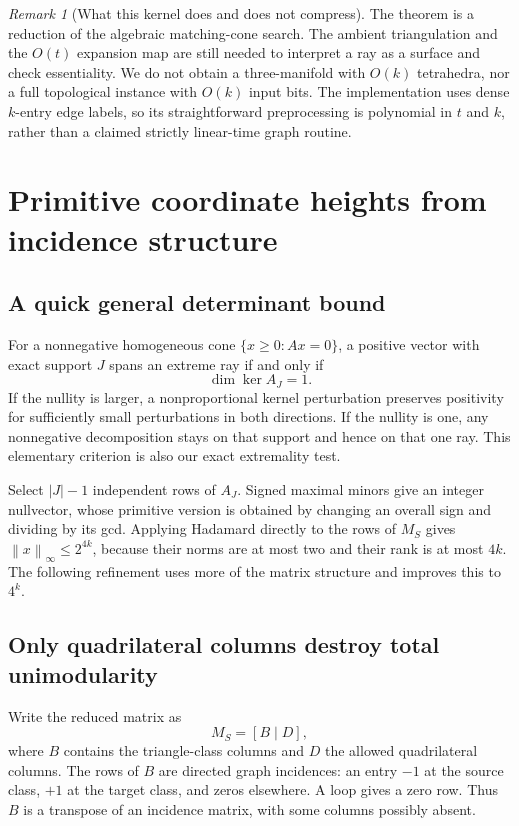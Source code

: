 \documentclass[11pt]{article}
\theoremstyle{definition}
\theoremstyle{remark}
\newtheorem{remark}[theorem]{Remark}
\newcommand{\norm}[1]{\left\lVert#1\right\rVert}
\begin{document}
\begin{remark}[What this kernel does and does not compress]
The theorem is a reduction of the algebraic matching-cone search. The ambient
triangulation and the $O(t)$ expansion map are still needed to interpret a ray
as a surface and check essentiality. We do not obtain a three-manifold with
$O(k)$ tetrahedra, nor a full topological instance with $O(k)$ input bits.
The implementation uses dense $k$-entry edge labels, so its straightforward
preprocessing is polynomial in $t$ and $k$, rather than a claimed strictly
linear-time graph routine.
\end{remark}

\section{Primitive coordinate heights from incidence structure}
\label{sec:height}

\subsection{A quick general determinant bound}

For a nonnegative homogeneous cone $\{x\ge0:Ax=0\}$, a positive vector with
exact support $J$ spans an extreme ray if and only if
\begin{equation}
 \dim\ker A_J=1.
 \label{eq:extremality}
\end{equation}
If the nullity is larger, a nonproportional kernel perturbation preserves
positivity for sufficiently small perturbations in both directions. If the
nullity is one, any nonnegative decomposition stays on that support and hence
on that one ray. This elementary criterion is also our exact extremality test.

Select $|J|-1$ independent rows of $A_J$. Signed maximal minors give an
integer nullvector, whose primitive version is obtained by changing an overall
sign and dividing by its gcd. Applying Hadamard directly to the rows of
$M_S$ gives $\norm{x}_\infty\le2^{4k}$, because their norms are at most two
and their rank is at most $4k$. The following refinement uses more of the
matrix structure and improves this to $4^k$.

\subsection{Only quadrilateral columns destroy total unimodularity}

Write the reduced matrix as
\begin{equation}
 M_S=[B\mid D],
 \label{eq:blockmatrix}
\end{equation}
where $B$ contains the triangle-class columns and $D$ the allowed quadrilateral
columns. The rows of $B$ are directed graph incidences: an entry $-1$ at the
source class, $+1$ at the target class, and zeros elsewhere. A loop gives a
zero row. Thus $B$ is a transpose of an incidence matrix, with some columns
possibly absent.
\end{document}
